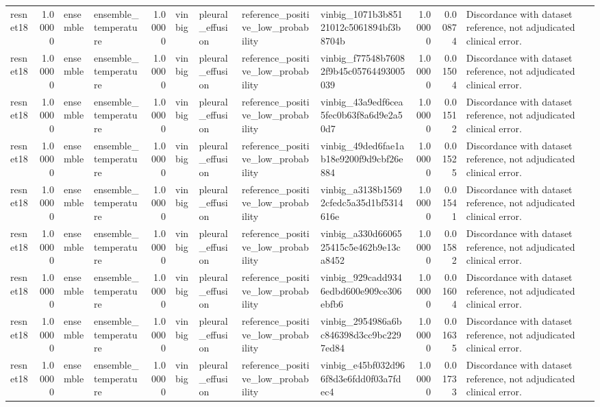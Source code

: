 \begin{tabular}{lrllrllllrrl}
resnet18 & 1.00000 & ensemble & ensemble\_temperature & 1.00000 & vinbig & pleural\_effusion & reference\_positive\_low\_probability & vinbig\_1071b3b85121012c5061894bf3b8704b & 1.00000 & 0.00874 & Discordance with dataset reference, not adjudicated clinical error. \\
resnet18 & 1.00000 & ensemble & ensemble\_temperature & 1.00000 & vinbig & pleural\_effusion & reference\_positive\_low\_probability & vinbig\_f77548b76082f9b45c05764493005039 & 1.00000 & 0.01504 & Discordance with dataset reference, not adjudicated clinical error. \\
resnet18 & 1.00000 & ensemble & ensemble\_temperature & 1.00000 & vinbig & pleural\_effusion & reference\_positive\_low\_probability & vinbig\_43a9edf6cea5fec0b63f8a6d9e2a50d7 & 1.00000 & 0.01512 & Discordance with dataset reference, not adjudicated clinical error. \\
resnet18 & 1.00000 & ensemble & ensemble\_temperature & 1.00000 & vinbig & pleural\_effusion & reference\_positive\_low\_probability & vinbig\_49ded6fae1ab18e9200f9d9cbf26e884 & 1.00000 & 0.01525 & Discordance with dataset reference, not adjudicated clinical error. \\
resnet18 & 1.00000 & ensemble & ensemble\_temperature & 1.00000 & vinbig & pleural\_effusion & reference\_positive\_low\_probability & vinbig\_a3138b15692cfedc5a35d1bf5314616e & 1.00000 & 0.01541 & Discordance with dataset reference, not adjudicated clinical error. \\
resnet18 & 1.00000 & ensemble & ensemble\_temperature & 1.00000 & vinbig & pleural\_effusion & reference\_positive\_low\_probability & vinbig\_a330d6606525415c5e462b9e13ca8452 & 1.00000 & 0.01582 & Discordance with dataset reference, not adjudicated clinical error. \\
resnet18 & 1.00000 & ensemble & ensemble\_temperature & 1.00000 & vinbig & pleural\_effusion & reference\_positive\_low\_probability & vinbig\_929cadd9346edbd600e909ce306ebfb6 & 1.00000 & 0.01604 & Discordance with dataset reference, not adjudicated clinical error. \\
resnet18 & 1.00000 & ensemble & ensemble\_temperature & 1.00000 & vinbig & pleural\_effusion & reference\_positive\_low\_probability & vinbig\_2954986a6bc846398d3cc9bc2297ed84 & 1.00000 & 0.01635 & Discordance with dataset reference, not adjudicated clinical error. \\
resnet18 & 1.00000 & ensemble & ensemble\_temperature & 1.00000 & vinbig & pleural\_effusion & reference\_positive\_low\_probability & vinbig\_e45bf032d966f8d3e6fdd0f03a7fdec4 & 1.00000 & 0.01733 & Discordance with dataset reference, not adjudicated clinical error. \\

\end{tabular}

